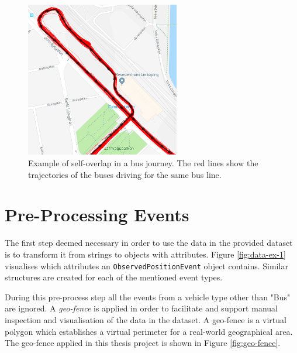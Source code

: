 \begin{figure}[t!]
    \centering
    \includegraphics[width=0.6\textwidth]{figures/self-overlap}
    \caption[Example of self-overlap in a bus journey]
    {\small Example of self-overlap in a bus journey. 
    The red lines show the trajectories of the buses driving for the same bus line.}
    \label{fig:self-overlap}
\end{figure}

\section{Pre-Processing Events} \label{sec:pre-process-events}
The first step deemed necessary in order to use the data in the provided dataset is to transform it from strings to objects with attributes.
Figure \ref{fig:data-ex-1} visualises which attributes an \texttt{ObservedPositionEvent} object contains.
Similar structures are created for each of the mentioned event types.

During this pre-process step all the events from a vehicle type other than "Bus" are ignored.
A \textit{geo-fence} is applied in order to facilitate and support manual inspection and visualisation of the data in the dataset.
A geo-fence is a virtual polygon which establishes a virtual perimeter for a real-world geographical area.
The geo-fence applied in this thesis project is shown in Figure \ref{fig:geo-fence}.

